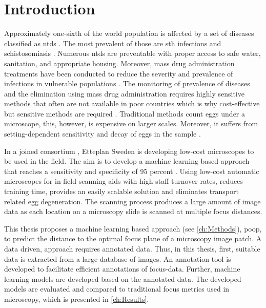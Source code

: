 \chapter{Introduction}
\label{ch:Introduction}

Approximately one-sixth of the world population is affected by a set of diseases classified as \acfp{ntd} \cite{feasey2010neglected}. The most prevalent of those are \acf{sth} infections and schistosomiasis \cite{barenbold2017estimating}. Numerous \acp{ntd} are preventable with proper access to safe water, sanitation, and appropriate housing. Moreover, mass drug administration treatments have been conducted to reduce the severity and prevalence of infections in vulnerable populations \cite{jourdan2018soiltransmitted}. The monitoring of prevalence of diseases and the elimination using mass drug administration requires highly sensitive methods that often are not available in poor countries which is why cost-effective but sensitive methods are required \cite{mbongngwese2020diagnostic}.
Traditional methods count eggs under a microscope, this, however, is expensive on larger scales. Moreover, it suffers from setting-dependent sensitivity and decay of eggs in the sample \cite{barenbold2017estimating}. 

In a joined consortium , Etteplan Sweden \cite{etteplanoyjengineering} is developing low-cost microscopes to be used in the field. The aim is to develop a machine learning based approach that reaches a sensitivity and specificity of 95 percent 
\cite{etteplan2021fighting}. Using low-cost automatic microscopes for in-field scanning aids with high-staff turnover rates, reduces training time, provides an easily scalable solution and eliminates transport related egg degeneration.
The scanning process produces a large amount of image data as each location on a microscopy slide is scanned at multiple focus distances.

This thesis proposes a machine learning based approach (see \autoref{ch:Methods}), \ac{poop}, to predict the distance to the optimal focus plane of a microscopy image patch. A data driven, approach requires annotated data. Thus, in this thesis, first, suitable data is extracted from a large database of images. An annotation tool is developed to facilitate efficient annotations of focus-data. Further, machine learning models are developed based on the annotated data. The developed models are evaluated and compared to traditional focus metrics used in microscopy, which is presented in \autoref{ch:Results}.

